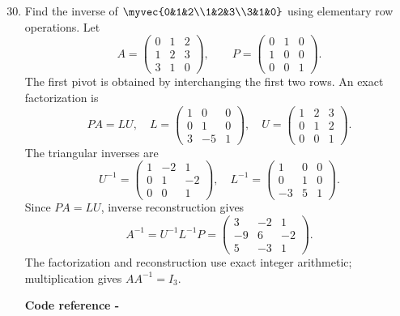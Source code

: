 \begin{enumerate}[label=\theenumi,leftmargin=4mm,itemsep=9pt]
\setcounter{enumi}{29}\item Find the inverse of $\myvec{0&1&2\\1&2&3\\3&1&0}$ using elementary row operations.
\solution Let
\[
A=\begin{pmatrix}0&1&2\\1&2&3\\3&1&0\end{pmatrix},
\qquad
P=\begin{pmatrix}0&1&0\\1&0&0\\0&0&1\end{pmatrix}.
\]
The first pivot is obtained by interchanging the first two rows.
An exact factorization is
\[
PA=LU,\quad
L=\begin{pmatrix}1&0&0\\0&1&0\\3&-5&1\end{pmatrix},
\quad
U=\begin{pmatrix}1&2&3\\0&1&2\\0&0&1\end{pmatrix}.
\]
The triangular inverses are
\[
U^{-1}=\begin{pmatrix}1&-2&1\\0&1&-2\\0&0&1\end{pmatrix},
\quad
L^{-1}=\begin{pmatrix}1&0&0\\0&1&0\\-3&5&1\end{pmatrix}.
\]
Since \(PA=LU\), inverse reconstruction gives
\[
A^{-1}=U^{-1}L^{-1}P
=\boxed{\begin{pmatrix}3&-2&1\\-9&6&-2\\5&-3&1\end{pmatrix}}.
\]
The factorization and reconstruction use exact integer arithmetic;
multiplication gives \(AA^{-1}=I_3\).
\par\smallskip
\noindent\textbf{Code reference -}
\par\noindent{}


\end{enumerate}
